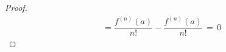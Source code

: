 \begin{theorem}
\begin{proof}
\begin{align*}
            &= \dfrac{f^{(n)}(a)}{n!} - \dfrac{f^{(n)}(a)}{n!} \hspace{2pt} = \hspace{2pt} 0
        \end{align*}
    \end{proof}
\end{theorem}
